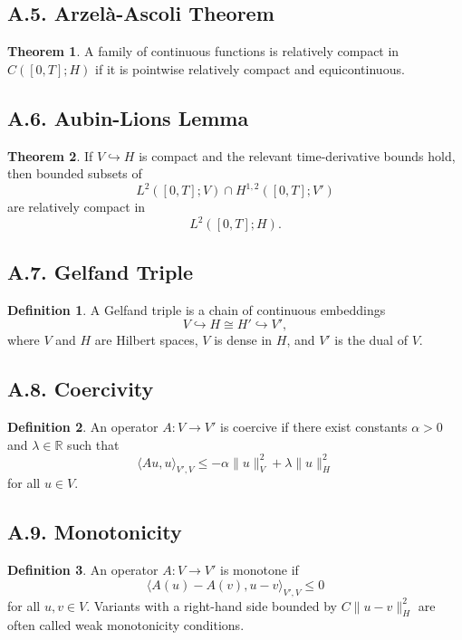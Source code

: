 \documentclass[11pt]{article}
\theoremstyle{definition}
\newtheorem{definition}{Definition}
\newtheorem{theorem}{Theorem}
\theoremstyle{remark}
\begin{document}
\subsection*{A.5. Arzelà-Ascoli Theorem}
\begin{theorem}
A family of continuous functions is relatively compact in \(C([0,T];H)\) if it is pointwise relatively compact and equicontinuous.
\end{theorem}

\subsection*{A.6. Aubin-Lions Lemma}
\begin{theorem}
If \(V\hookrightarrow H\) is compact and the relevant time-derivative bounds hold, then bounded subsets of
\[
L^2([0,T];V)\cap H^{1,2}([0,T];V')
\]
are relatively compact in
\[
L^2([0,T];H).
\]
\end{theorem}

\subsection*{A.7. Gelfand Triple}
\begin{definition}
A Gelfand triple is a chain of continuous embeddings
\[
V\hookrightarrow H\cong H'\hookrightarrow V',
\]
where \(V\) and \(H\) are Hilbert spaces, \(V\) is dense in \(H\), and \(V'\) is the dual of \(V\).
\end{definition}

\subsection*{A.8. Coercivity}
\begin{definition}
An operator \(A:V\to V'\) is coercive if there exist constants \(\alpha>0\) and \(\lambda\in\mathbb R\) such that
\[
\langle Au,u\rangle_{V',V}\le -\alpha\|u\|_V^2+\lambda\|u\|_H^2
\]
for all \(u\in V\).
\end{definition}

\subsection*{A.9. Monotonicity}
\begin{definition}
An operator \(A:V\to V'\) is monotone if
\[
\langle A(u)-A(v),u-v\rangle_{V',V}\le 0
\]
for all \(u,v\in V\). Variants with a right-hand side bounded by \(C\|u-v\|_H^2\) are often called weak monotonicity conditions.
\end{definition}
\end{document}
